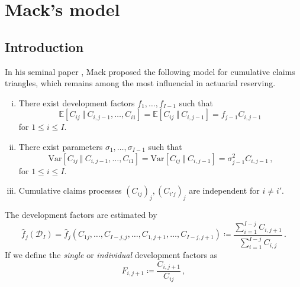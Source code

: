 \documentclass[a4paper]{book}
\begin{document}
\chapter{Mack's model} \label{chapter:mack}

\section{Introduction} \label{sec:mack-intro}

In his seminal paper \cite{mack:chain-ladder}, Mack proposed the following model for cumulative claims triangles, which remains among the most influencial in actuarial reserving.
\begin{model} \label{model:mack} \leavevmode
    \begin{enumerate}[(i)]
        \item There exist development factors $f_1, \dots, f_{I - 1}$ such that
        \begin{equation} \label{eq:mack-expectation}
            \mathbb{E}[C_{ij} \ \Vert \ C_{i, j - 1}, \dots, C_{i1}] = \mathbb{E}[C_{ij} \ \Vert \ C_{i, j - 1}] = f_{j - 1} C_{i, j - 1}\,
        \end{equation}
        for $1 \leq i \leq I$.
        \item There exist parameters $\sigma_1, \dots, \sigma_{I - 1}$ such that
        \begin{equation} \label{eq:mack-variance}
            \mathrm{Var}[C_{ij} \ \Vert \ C_{i, j - 1}, \dots, C_{i1}] = \mathrm{Var}[C_{ij} \ \Vert \ C_{i, j - 1}] = \sigma_{j - 1}^2 C_{i, j - 1}\,,
        \end{equation}
        for $1 \leq i \leq I$.
        \item Cumulative claims processes $(C_{ij})_j, (C_{i'j})_j$ are independent for $i \neq i'$.
    \end{enumerate}
\end{model}
The development factors are estimated by
\begin{equation} \label{eq:devfac-estimator}
    \widehat{f}_j(\mathcal{D}_I) = \widehat{f}_j(C_{1j}, \dots, C_{I - j, j}, \dots, C_{1, j + 1}, \dots, C_{I - j, j + 1}) \coloneqq \frac{\sum_{i = 1}^{I - j} C_{i, j + 1}}{\sum_{i = 1}^{I - j} C_{i, j}} \,.
\end{equation}
If we define the \emph{single} or \emph{individual} development factors as
\begin{equation}
    F_{i, j + 1} \coloneqq \frac{C_{i, j + 1}}{C_{ij}} \,,
\end{equation}
\end{document}
